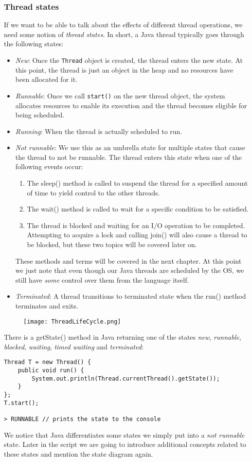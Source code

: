 \documentclass[main]{subfiles}
\begin{document}
\subsubsection{Thread states}
If we want to be able to talk about the effects of different thread operations, we need some notion of \textit{thread states}. In short, a Java thread typically goes through the following states:
\begin{itemize}
    \item \textit{New}: Once the \texttt{Thread} object is created, the thread enters the new state. At this point, the thread is just an object in the heap and no resources have been allocated for it.
    \item \textit{Runnable}: Once we call \texttt{start()} on the new thread object, the system allocates resources to enable its execution and the thread becomes eligible for being scheduled.
    \item \textit{Running}: When the thread is actually scheduled to run.
    \item \textit{Not runnable}: We use this as an umbrella state for multiple states that cause the thread to not be runnable. The thread enters this state when one of the following events occur:
        \begin{enumerate}
            \item The sleep() method is called to suspend the thread for a specified amount of time to yield control to the other threads.
            \item The wait() method is called to wait for a specific condition to be satisfied.
            \item The thread is blocked and waiting for an I/O operation to be completed. Attempting to acquire a lock and calling join() will also cause a thread to be blocked, but these two topics will be covered later on.
        \end{enumerate}
    These methods and terms will be covered in the next chapter. At this point we just note that even though our Java threads are scheduled by the OS, we still have \textit{some} control over them from the language itself.
    \item \textit{Terminated}: A thread transitions to terminated state when the run() method terminates and exits.
\end{itemize}
\begin{figure}[H]
    \centering
    \texttt{[image: ThreadLifeCycle.png]}
\end{figure}
There is a getState() method in Java returning one of the states \textit{new}, \textit{runnable}, \textit{blocked}, \textit{waiting}, \textit{timed waiting} and \textit{terminated}:
\begin{verbatim}
Thread T = new Thread() {
    public void run() {
        System.out.println(Thread.currentThread().getState());
    }
};
T.start();

> RUNNABLE // prints the state to the console
\end{verbatim}
We notice that Java differentiates some states we simply put into a \textit{not runnable} state. Later in the script we are going to introduce additional concepts related to these states and mention the state diagram again.
\end{document}

